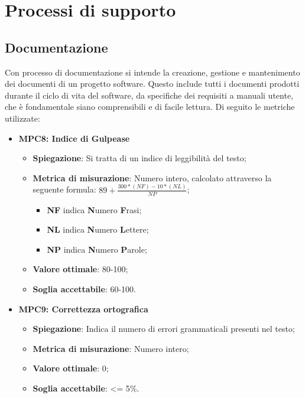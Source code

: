\section{Processi di supporto}


\subsection{Documentazione}
Con processo di documentazione si intende la creazione, gestione e mantenimento dei documenti di un progetto software. Questo include tutti i documenti prodotti durante il ciclo di vita del software, da specifiche dei requisiti a manuali utente, che è fondamentale siano comprensibili e di facile lettura. Di seguito le metriche utilizzate:
\begin{itemize}
    \item \textbf{MPC8: Indice di Gulpease}
    \begin{itemize}
        \item \textbf{Spiegazione}: Si tratta di un indice di leggibilità del testo;
        \item \textbf{Metrica di misurazione}: Numero intero, calcolato attraverso la seguente formula: \textbf{$89 + \frac{300*(NF)-10*(NL)}{NP}$};
            \begin{itemize}
                \item \textbf{NF} indica \textbf{N}umero \textbf{F}rasi;
                \item \textbf{NL} indica \textbf{N}umero \textbf{L}ettere;
                \item \textbf{NP} indica \textbf{N}umero \textbf{P}arole;
            \end{itemize}
        \item \textbf{Valore ottimale}: 80-100;
        \item \textbf{Soglia accettabile}: 60-100.
    \end{itemize}

    \item \textbf{MPC9: Correttezza ortografica}
    \begin{itemize}
        \item \textbf{Spiegazione}: Indica il numero di errori grammaticali presenti nel testo;
        \item \textbf{Metrica di misurazione}: Numero intero;
        \item \textbf{Valore ottimale}: 0;
        \item \textbf{Soglia accettabile}: <= 5\%.
    \end{itemize}
\end{itemize}

